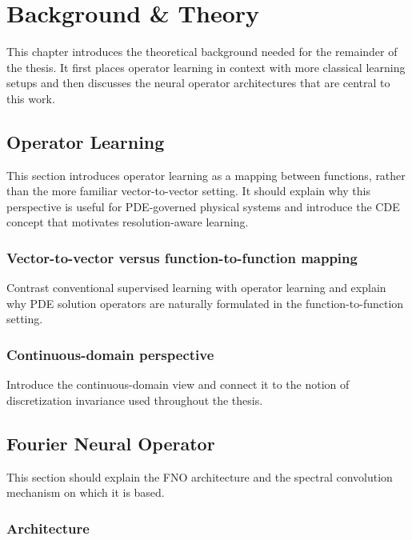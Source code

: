 \chapter{\label{cha:background}Background \& Theory}

This chapter introduces the theoretical background needed for the
remainder of the thesis. It first places operator learning in context
with more classical learning setups and then discusses the neural
operator architectures that are central to this work.

\section{Operator Learning}

This section introduces operator learning as a mapping between
functions, rather than the more familiar vector-to-vector setting. It
should explain why this perspective is useful for PDE-governed physical
systems and introduce the CDE concept that motivates resolution-aware
learning.

\subsection{Vector-to-vector versus function-to-function mapping}

Contrast conventional supervised learning with operator learning and
explain why PDE solution operators are naturally formulated in the
function-to-function setting.

\subsection{Continuous-domain perspective}

Introduce the continuous-domain view and connect it to the notion of
discretization invariance used throughout the thesis.

\section{Fourier Neural Operator}

This section should explain the FNO architecture and the spectral
convolution mechanism on which it is based.

\subsection{Architecture}

